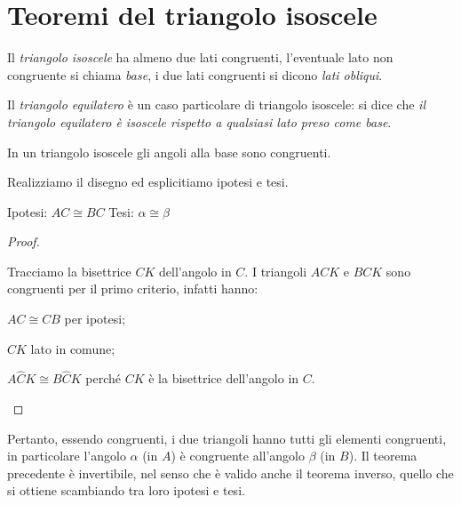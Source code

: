 \section{Teoremi del triangolo isoscele}
\label{sect:teoremi_triangolo_isoscele}

Il \emph{triangolo isoscele} ha almeno due lati congruenti, 
l'eventuale lato non congruente si chiama \emph{base}, i due lati 
congruenti si dicono \emph{lati obliqui}.

Il \emph{triangolo equilatero} è un caso particolare di triangolo 
isoscele: si dice che \emph{il triangolo equilatero è isoscele 
rispetto a qualsiasi lato preso come base}.

\begin{teorema}
In un triangolo isoscele gli angoli alla base sono congruenti.
\end{teorema}

Realizziamo il disegno ed esplicitiamo ipotesi e tesi.

\noindent Ipotesi: \(AC\cong BC\)
\tab Tesi: \(\alpha\cong \beta\)

\begin{proof}
\begin{multicols}{2}
Tracciamo la bisettrice \(CK\) dell'angolo in \(C\).
I triangoli \(ACK\) e \(BCK\) sono congruenti per il primo criterio, 
infatti hanno:
\begin{itemize*}
\item \(AC\cong CB\) per ipotesi;
\item \(CK\) lato in comune;
\item \(A\widehat{C}K\cong B\widehat{C}K\) perché \(CK\) è la bisettrice 
dell'angolo in \(C\).
\end{itemize*}
\begin{center}
\begin{inaccessibleblock}

\end{inaccessibleblock}
\end{center}
\end{multicols}
\end{proof}

Pertanto, essendo congruenti, i due triangoli hanno tutti gli 
elementi congruenti, in particolare l'angolo \(\alpha\) (in \(A\)) è 
congruente all'angolo \(\beta\) (in \(B\)).
Il teorema precedente è invertibile, nel senso che è valido anche il 
teorema inverso, quello che si ottiene scambiando tra loro ipotesi e 
tesi.

